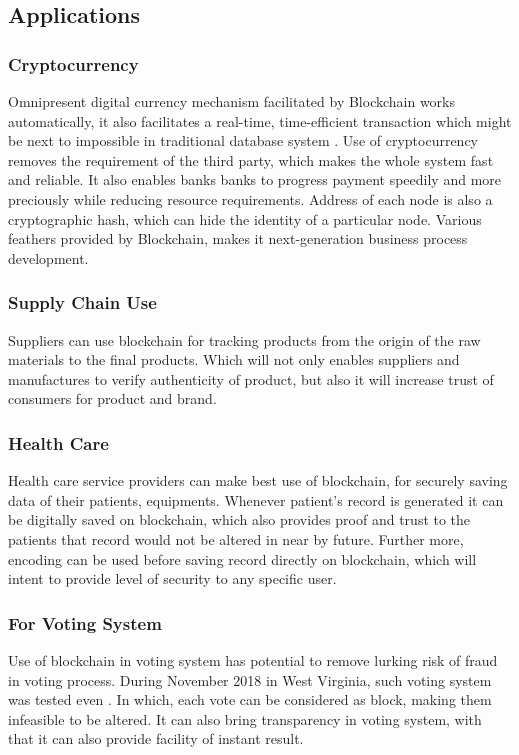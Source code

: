 \documentclass[a4paper,twoside,12pt]{report}
\begin{document}
\begin{spacing}{1.5}
\section{Applications}
\subsubsection{Cryptocurrency}
Omnipresent digital currency mechanism facilitated by Blockchain works automatically, it also facilitates a real-time, time-efficient transaction which might be next to impossible in traditional database system \cite{overviewofblockchainsecurity,democraticmininginbitcoins}. Use of cryptocurrency removes the requirement of the third party, which makes the whole system fast and reliable. It also enables banks banks to progress payment speedily and more preciously while reducing resource requirements.
Address of each node is also a cryptographic hash, which can hide the identity of a particular node.  Various feathers provided by Blockchain, makes it next-generation business process development.
\subsubsection{Supply Chain Use}
Suppliers can use blockchain for tracking products from the origin of the raw materials to the final products. Which will not only enables suppliers and manufactures to verify authenticity of product, but also it will increase trust of consumers for product and brand.
\subsubsection{Health Care}
Health care service providers can make best use of blockchain, for securely saving data of their patients, equipments. Whenever patient's record is generated it can be digitally saved on blockchain, which also provides proof and trust to the patients that record would not be altered in near by future. Further more, encoding can be used before saving record directly on blockchain, which will intent to provide level of security to any specific user. 
\subsubsection{For Voting System}
Use of blockchain in voting system has potential to remove lurking risk of fraud in voting process. During November 2018 in West Virginia, such voting system was tested even \cite{blockchain_in_voting}. In which, each vote can be considered as block, making them infeasible to be altered. It can also bring transparency in voting system, with that it can also provide facility of instant result.

\end{spacing}
\end{document}
